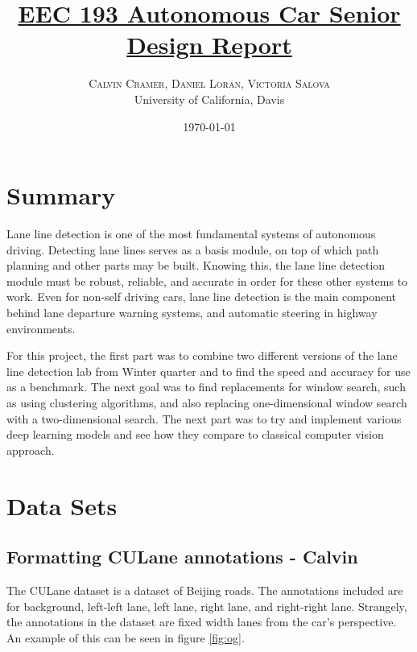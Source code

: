\documentclass[twoside,twocolumn]{article}
\title{\href{https://github.com/vsalova/lane_lines}{EEC 193 Autonomous Car Senior Design Report}} %
\author{%
\textsc{Calvin Cramer, Daniel Loran, Victoria Salova} \\ %
\normalsize University of California, Davis \\ %
}
\date{\today} %
\begin{document}
\maketitle


\section{Summary}

\par Lane line detection is one of the most fundamental systems of autonomous driving. Detecting lane lines serves as a basis module, on top of which path planning and other parts may be built. Knowing this, the lane line detection module must be robust, reliable, and accurate in order for these other systems to work. Even for non-self driving cars, lane line detection is the main component behind lane departure warning systems, and automatic steering in highway environments.
\par For this project, the first part was to combine two different versions of the lane line detection lab from Winter quarter and to find the speed and accuracy for use as a benchmark. The next goal was to find replacements for window search, such as using clustering algorithms, and also replacing one-dimensional window search with a two-dimensional search. The next part was to try and implement various deep learning models and see how they compare to classical computer vision approach.


\section{Data Sets}
\subsection{Formatting CULane annotations - Calvin}
\par The CULane dataset is a dataset of Beijing roads. The annotations included are for background, left-left lane, left lane, right lane, and right-right lane. Strangely, the annotations in the dataset are fixed width lanes from the car's perspective. An example of this can be seen in figure \ref{fig:og}.
\end{document}
